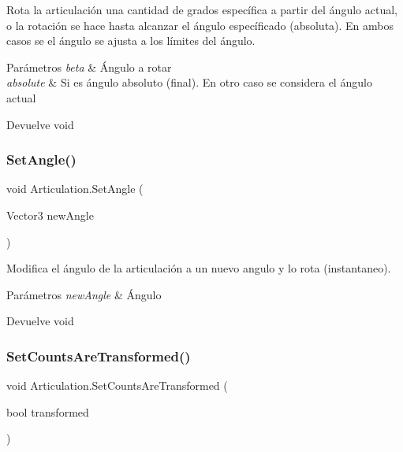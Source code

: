 Rota la articulación una cantidad de grados específica a partir del ángulo actual, o la rotación se hace hasta alcanzar el ángulo específicado (absoluta). En ambos casos se el ángulo se ajusta a los límites del ángulo. 
\begin{DoxyParams}{Parámetros}
{\em beta} & Ángulo a rotar \\
\hline
{\em absolute} & Si es ángulo absoluto (final). En otro caso se considera el ángulo actual \\
\hline
\end{DoxyParams}
\begin{DoxyReturn}{Devuelve}
void 
\end{DoxyReturn}
\mbox{\label{class_articulation_a5091b1cabb19fb26e8937857bf0a3ac5}} 
\subsubsection{\texorpdfstring{SetAngle()}{SetAngle()}}
{\footnotesize\ttfamily void Articulation.\+Set\+Angle (\begin{DoxyParamCaption}\item[{Vector3}]{new\+Angle }\end{DoxyParamCaption})\hspace{0.3cm}{\ttfamily [inline]}}

Modifica el ángulo de la articulación a un nuevo angulo y lo rota (instantaneo). 
\begin{DoxyParams}{Parámetros}
{\em new\+Angle} & Ángulo \\
\hline
\end{DoxyParams}
\begin{DoxyReturn}{Devuelve}
void 
\end{DoxyReturn}
\mbox{\label{class_articulation_ae1b9d736b24392a46c7d53e91cbe7908}} 
\subsubsection{\texorpdfstring{SetCountsAreTransformed()}{SetCountsAreTransformed()}}
{\footnotesize\ttfamily void Articulation.\+Set\+Counts\+Are\+Transformed (\begin{DoxyParamCaption}\item[{bool}]{transformed }\end{DoxyParamCaption})\hspace{0.3cm}{\ttfamily [inline]}}

